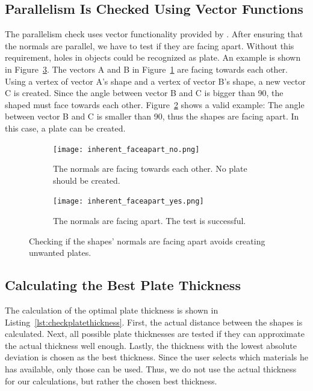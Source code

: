 \documentclass[../ClassicThesis.tex]{subfiles}
\begin{document}
\subsection{Parallelism Is Checked Using Vector Functions}

The parallelism check uses vector functionality provided by \threejs{}. After ensuring that the normals are parallel, we have to test if they are facing apart. Without this requirement, holes in objects could be recognized as plate. An example is shown in Figure~\ref{fig:inherent_faceapart}. The vectors A and B in Figure~\ref{fig:inherent_faceapart:no} are facing towards each other. Using a vertex of vector A's shape and a vertex of vector B's shape, a new vector C is created. Since the angle between vector B and C is bigger than 90\textdegree{}, the shaped must face towards each other. Figure~\ref{fig:inherent_faceapart:yes} shows a valid example: The angle between vector B and C is smaller than 90{\textdegree}, thus the shapes are facing apart. In this case, a plate can be created.

\begin{figure}
  \centering
  \begin{subfigure}[t]{0.49\textwidth}
    \centering
    \texttt{[image: inherent\_faceapart\_no.png]}
    \caption{The normals are facing towards each other. No plate should be created.}
    \label{fig:inherent_faceapart:no}
  \end{subfigure}
  \begin{subfigure}[t]{0.49\textwidth}
    \centering
    \texttt{[image: inherent\_faceapart\_yes.png]}
    \caption{The normals are facing apart. The test is successful.}
    \label{fig:inherent_faceapart:yes}
  \end{subfigure}
  \caption{Checking if the shapes' normals are facing apart avoids creating unwanted plates.}
  \label{fig:inherent_faceapart}
\end{figure}

\subsection{Calculating the Best Plate Thickness}

The calculation of the optimal plate thickness is shown in Listing~\ref{lst:checkplatethickness}. First, the actual distance between the shapes is calculated. Next, all possible plate thicknesses are tested if they can approximate the actual thickness well enough. Lastly, the thickness with the lowest absolute deviation is chosen as the best thickness. Since the user selects which materials he has available, only those can be used. Thus, we do not use the actual thickness for our calculations, but rather the chosen best thickness.
\end{document}
